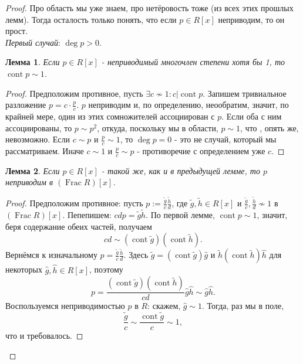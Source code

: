 \documentclass[a4paper,100pt]{article}
\theoremstyle{indented}
\newtheorem{lemma}{Лемма}
\theoremstyle{definition}
\theoremstyle{remark}
\DeclareMathOperator{\Frac}{Frac}
\DeclareMathOperator{\cont}{cont}
\begin{document}
\begin{proof}
    Про область мы уже знаем, про нетёровость тоже (из всех этих прошлых лемм). Тогда осталость только понять, что если $p\in R[x]$ неприводим, то он прост.\\

    \textit{Первый случай}: $\deg p>0$. \\

    \begin{lemma}
        Если $p\in R[x]$ - неприводимый многочлен степени хотя бы 1, то $\cont p\sim 1$.
    \end{lemma}

    \begin{proof}
        Предположим противное, пусть $\exists c\nsim 1: c\vert \cont p$. Запишем тривиальное разложение $p=c\cdot \frac{p}{c}$. $p$ неприводим и, по определению, неообратим, значит, по крайней мере, один из этих сомножителей ассоциирован с $p$. Если оба с ним ассоциированы, то $p\sim p^2$, откуда, поскольку мы в области, $p\sim 1$, что , опять же, невозможно. Если $c\sim p$ и $\frac{p}{c}\sim 1$, то $\deg p = 0$ - это не случай, который мы рассматриваем. Иначе $c\sim 1$ и $\frac{p}{c}\sim p$ - противоречие с определением уже $c$.
    \end{proof}

    \begin{lemma}
        Если $p\in R[x]$ - такой же, как и в предыдущей лемме, то $p$ неприводим в $(\Frac R)[x]$.
    \end{lemma}

    \begin{proof}
        Предположим противное: пусть $p:=\frac{\tilde{g}}{c}\frac{\tilde{h}}{d}$, где $\tilde{g}, \tilde{h}\in R[x]$ и $\frac{\tilde{g}}{c}, \frac{\tilde{h}}{d}\nsim 1$ в $(\Frac R)[x]$. Пепепишем: $cdp=\tilde{g}\tilde{h}$. По первой лемме, $\cont p\sim 1$, значит, беря содержание обеих частей, получаем 
        \[
            cd\sim (\cont \tilde{g})(\cont \tilde{h}).
        \]
        Вернёмся к изначальному $p=\frac{\tilde{g}}{c}\frac{\tilde{h}}{d}$. Здесь $\tilde{g}=(\cont \tilde{g})\hat{g}$ и $\tilde{h}(\cont \tilde{h})\hat{h}$ для некоторых $\hat{g}, \hat{h}\in R[x]$, поэтому
        \[
            p=\frac{(\cont \tilde{g})(\cont \tilde{h})}{cd}\hat{g}\hat{h}\sim \hat{g}\hat{h}.
        \]
        Воспользуемся неприводимостью $p$ в $R$: скажем, $\hat{g}\sim 1$. Тогда, раз мы в поле, 
        \[
            \frac{\tilde{g}}{c}\sim\frac{\cont \tilde{g}}{c}\sim 1, 
        \]
        что и требовалось.
    \end{proof}


\end{proof}
\end{document}
